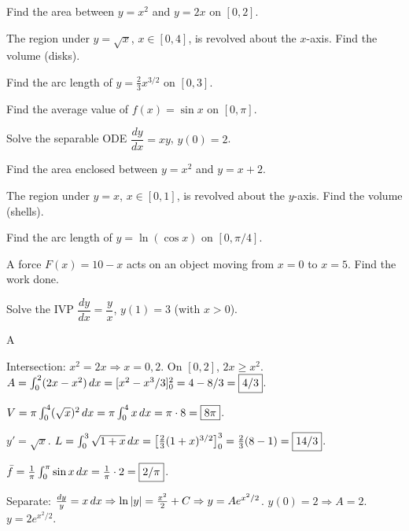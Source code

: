 \documentclass[11pt]{article}
\begin{document}
\begin{problems}
\item Find the area between $y = x^2$ and $y = 2x$ on $[0, 2]$.
\item The region under $y = \sqrt{x}$, $x \in [0, 4]$, is revolved about the $x$-axis. Find the volume (disks).
\item Find the arc length of $y = \tfrac{2}{3} x^{3/2}$ on $[0, 3]$.
\item Find the average value of $f(x) = \sin x$ on $[0, \pi]$.
\item Solve the separable ODE $\dfrac{dy}{dx} = xy$, $y(0) = 2$.
\end{problems}

\vfill
\newpage
{}
\begin{problems}
\item Find the area enclosed between $y = x^2$ and $y = x + 2$.
\item The region under $y = x$, $x \in [0, 1]$, is revolved about the $y$-axis. Find the volume (shells).
\item Find the arc length of $y = \ln(\cos x)$ on $[0, \pi/4]$.
\item A force $F(x) = 10 - x$ acts on an object moving from $x = 0$ to $x = 5$. Find the work done.
\item Solve the IVP $\dfrac{dy}{dx} = \dfrac{y}{x}$, $y(1) = 3$ (with $x > 0$).
\end{problems}

\vfill
\newpage
{}

\begin{answers}{A}
\item Intersection: $x^2 = 2x \Rightarrow x = 0, 2$. On $[0,2]$, $2x \ge x^2$. $A = \int_0^2 (2x - x^2) \,dx = [x^2 - x^3/3]_0^2 = 4 - 8/3 = \boxed{4/3}$.
\item $V = \pi \int_0^4 (\sqrt x)^2 \,dx = \pi \int_0^4 x \,dx = \pi \cdot 8 = \boxed{8\pi}$.
\item $y' = \sqrt x$. $L = \int_0^3 \sqrt{1 + x} \,dx = \bigl[\tfrac{2}{3}(1+x)^{3/2}\bigr]_0^3 = \tfrac{2}{3}(8 - 1) = \boxed{14/3}$.
\item $\bar f = \tfrac{1}{\pi} \int_0^\pi \sin x \,dx = \tfrac{1}{\pi} \cdot 2 = \boxed{2/\pi}$.
\item Separate: $\tfrac{dy}{y} = x \,dx \Rightarrow \ln|y| = \tfrac{x^2}{2} + C \Rightarrow y = A e^{x^2/2}$. $y(0) = 2 \Rightarrow A = 2$. $\boxed{y = 2 e^{x^2/2}}$.
\end{answers}
\end{document}
